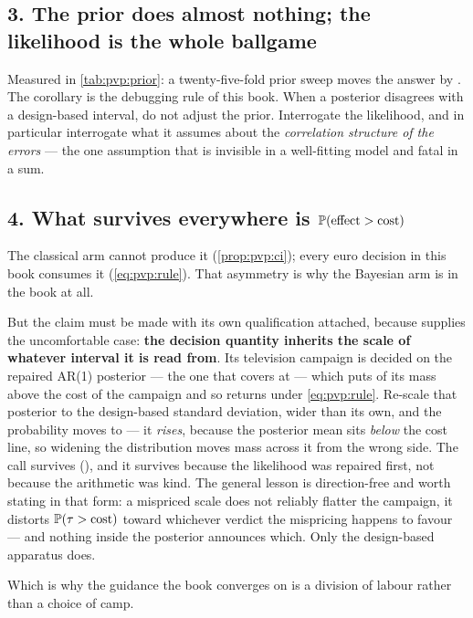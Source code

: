 \subsection*{3. The prior does almost nothing; the likelihood is the whole ballgame}

Measured in \cref{tab:pvp:prior}: a twenty-five-fold prior sweep moves the answer by
\eur{\nbZeroPriorShift}. The corollary is the debugging rule of this book. When a posterior
disagrees with a design-based interval, do not adjust the prior. Interrogate the likelihood, and in
particular interrogate what it assumes about the \emph{correlation structure of the errors} --- the
one assumption that is invisible in a well-fitting model and fatal in a sum.

\subsection*{4. What survives everywhere is $\operatorname{\mathbb{P}}(\text{effect} > \text{cost})$}

The classical arm cannot produce it (\cref{prop:pvp:ci}); every euro decision in this book consumes
it (\cref{eq:pvp:rule}). That asymmetry is why the Bayesian arm is in the book at all.

But the claim must be made with its own qualification attached, because  supplies the
uncomfortable case: \textbf{the decision quantity inherits the scale of whatever interval it is read
from}. Its television campaign is decided on the repaired AR(1) posterior --- the one that covers at
\pc{\nbSevenTotalCovArone} --- which puts \nbSevenPGo{} of its mass above the cost of the campaign
and so returns \textbf{\nbSevenDecision} under \cref{eq:pvp:rule}. Re-scale that posterior to the
design-based standard deviation, wider than its own, and the probability moves to
\nbSevenPGoRescaled{} --- it \emph{rises}, because the posterior mean sits \emph{below} the cost
line, so widening the distribution moves mass across it from the wrong side. The call survives
(\nbSevenDecisionRescaled), and it survives because the likelihood was repaired first, not because
the arithmetic was kind. The general lesson is direction-free and worth stating in that form: a
mispriced scale does not reliably flatter the campaign, it distorts $\operatorname{\mathbb{P}}(\tau > \text{cost})$
toward whichever verdict the mispricing happens to favour --- and nothing inside the posterior
announces which. Only the design-based apparatus does.

Which is why the guidance the book converges on is a division of labour rather than a choice of
camp.

